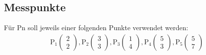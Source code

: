\documentclass[a4paper,10pt,pdftex,pagesize]{scrartcl}
\begin{document}
\subsection{Messpunkte}
\label{subsecMesspunkte}
Für Pn soll jeweils einer folgenden Punkte verwendet werden:
\begin{align*}
\text{P}_1 \left( \begin{array}{c} 2\\ 2\end{array} \right),
\text{P}_2 \left( \begin{array}{c} 3\\ 3\end{array} \right),
\text{P}_3 \left( \begin{array}{c} 1\\ 4\end{array} \right),
\text{P}_4 \left( \begin{array}{c} 5\\ 3\end{array} \right),
\text{P}_5 \left( \begin{array}{c} 5\\ 7\end{array} \right)
\end{align*}
\end{document}
